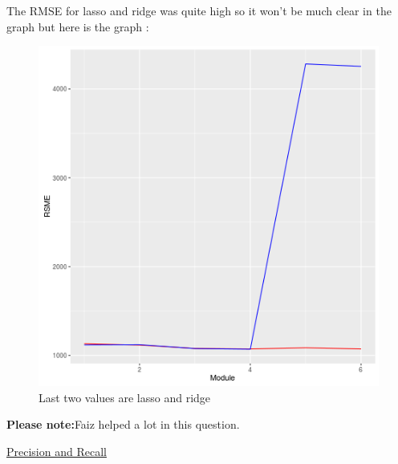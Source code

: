 \documentclass{article}
\begin{document}
The RMSE for lasso and ridge was quite high so it won't be much clear in the graph but here is the graph : \\
\begin{figure}[H]
\includegraphics[scale=1]{all_modules.png}
\caption{Last two values are lasso and ridge}
\end{figure}
\textbf{Please note:}Faiz helped a lot in this question.
\begin{thebibliography}{9}
	\href{https://en.wikipedia.org/wiki/Precision_and_recall}{Precision and Recall}
\end{thebibliography}
\end{document}
